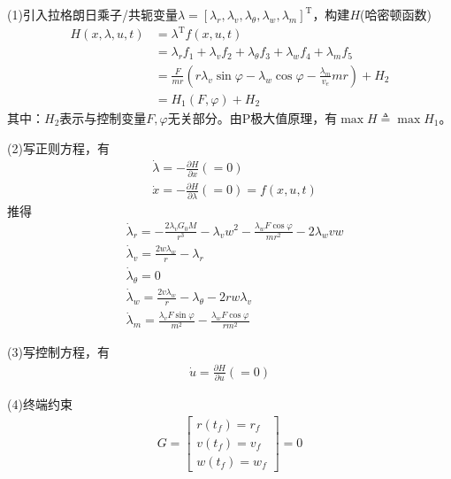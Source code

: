             (1)引入拉格朗日乘子/共轭变量$\lambda = [\lambda_r,\lambda_v,\lambda_\theta,\lambda_w,\lambda_m]^\mathrm{T}$，构建$H$(哈密顿函数)
            \begin{align*}
            H(x,\lambda,u,t) & = \lambda^\mathrm{T}f(x,u,t)\\
            & = \lambda_r f_1+\lambda_vf_2+\lambda_\theta f_3+\lambda_wf_4+\lambda_m f_5\\
            & = \frac{F}{mr} \left( r\lambda_v\sin \varphi-\lambda_w\cos\varphi-\frac{\lambda_m}{v_e}mr \right) +H_2\\
            & = H_1(F,\varphi)+H_2
            \end{align*}
            其中：$H_2$表示与控制变量$F,\varphi$无关部分。由P极大值原理，有$\max H \triangleq \max H_1$。
            \par
            (2)写正则方程，有
            \begin{align*}
            & \dot{\lambda} = -\frac{\partial H}{\partial x} (= 0)\\
            & \dot{x} = -\frac{\partial H}{\partial \lambda} (= 0) = f(x,u,t)
            \end{align*}
            推得
            \begin{align*}
            & \dot{\lambda}_r = -\frac{2\lambda_v G_0M}{r^3} - \lambda_v w^2 - \frac{\lambda_w F\cos\varphi}{mr^2} - 2\lambda_w vw\\
            & \dot{\lambda}_v = \frac{2w\lambda_w}{r} - \lambda_r\\
            & \dot{\lambda}_\theta = 0\\
            & \dot{\lambda}_w = \frac{2v\lambda_w}{r} - \lambda_\theta-2rw\lambda_v\\
            & \dot{\lambda}_m = \frac{\lambda_vF\sin\varphi}{m^2} - \frac{\lambda_w F\cos\varphi}{rm^2}
            \end{align*}
            \par
            (3)写控制方程，有
            \begin{align*}
            \dot{u} = \frac{\partial H}{\partial u}(=0)
            \end{align*}
            \par
            (4)终端约束
            \begin{align*}
            G = \left[
            \begin{aligned}
            r(t_f) = r_f\\
            v(t_f) = v_f\\
            w(t_f) = w_f
            \end{aligned}
            \right] = 0
            \end{align*}
